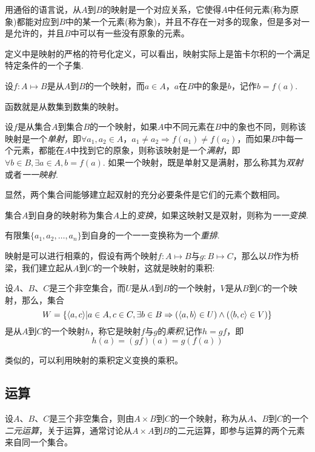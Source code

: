 用通俗的语言说，从$A$到$B$的映射是一个对应关系，它使得$A$中任何元素(称为原象)都能对应到$B$中的某一个元素(称为象)，并且不存在一对多的现象，但是多对一是允许的，并且$B$中可以有一些没有原象的元素。

定义中是映射的严格的符号化定义，可以看出，映射实际上是笛卡尔积的一个满足特定条件的一个子集.

设$f: A \mapsto B$是从$A$到$B$的一个映射，而$a \in A$，$a$在$B$中的象是$b$，记作$b=f(a)$.

函数就是从数集到数集的映射。

\begin{definition}
  设$f$是从集合$A$到集合$B$的一个映射，如果$A$中不同元素在$B$中的象也不同，则称该映射是一个\emph{单射}，即$\forall a_1,a_2 \in A，a_1 \neq a_2 \Rightarrow f(a_1) \neq f(a_2)$，而如果$B$中每一个元素，都能在$A$中找到它的原象，则称该映射是一个\emph{满射}，即$\forall b \in B, \exists a \in A, b=f(a)$. 如果一个映射，既是单射又是满射，那么称其为\emph{双射}或者\emph{一一映射}.
\end{definition}

显然，两个集合间能够建立起双射的充分必要条件是它们的元素个数相同。

\begin{definition}
  集合$A$到自身的映射称为集合$A$上的\emph{变换}，如果这映射又是双射，则称为\emph{一一变换}.
\end{definition}

有限集$\{a_1,a_2,\ldots,a_n\}$到自身的一个一一变换称为一个\emph{重排}.

映射是可以进行相乘的，假设有两个映射$f: A \mapsto B$与$g: B \mapsto C$，那么以$B$作为桥梁，我们建立起从$A$到$C$的一个映射，这就是映射的乘积:

\begin{definition}
  设$A$、$B$、$C$是三个非空集合，而$U$是从$A$到$B$的一个映射，$V$是从$B$到$C$的一个映射，那么，集合
  \[ W = \{ \langle a, c \rangle | a \in A, c \in C, \exists b \in B \Rightarrow (\langle a, b \rangle \in U) \land (\langle b, c \rangle \in V) \} \]
  是从$A$到$C$的一个映射$h$，称它是映射$f$与$g$的\emph{乘积},记作$h=gf$，即
  \[ h(a) = (gf)(a) = g(f(a)) \]
\end{definition}

类似的，可以利用映射的乘积定义变换的乘积。

\subsection{运算}
\label{sec:operation}

\begin{definition}
  设$A$、$B$、$C$是三个非空集合，则由$A \times B$到$C$的一个映射，称为从$A$、$B$到$C$的一个\emph{二元运算}，关于运算，通常讨论从$A \times A$到$B$的二元运算，即参与运算的两个元素来自同一个集合。
\end{definition}

